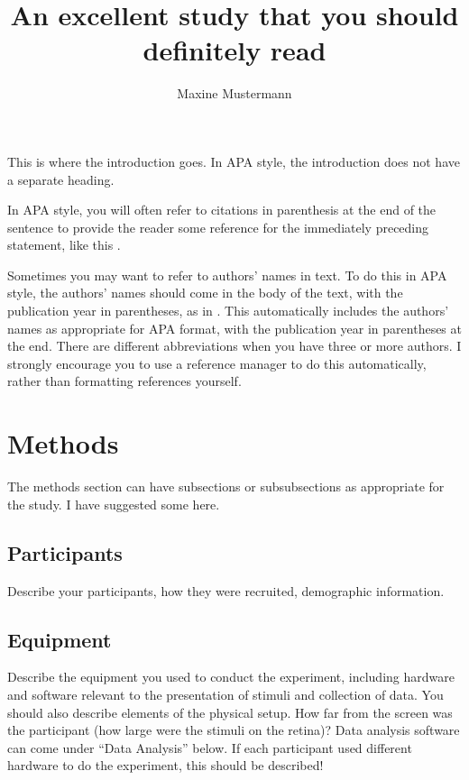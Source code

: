 \documentclass[
    a4paper,
    doc, %
    natbib
]{apa6}
\title{An excellent study that you should definitely read}
\author{Maxine Mustermann}
\affiliation{Centre for Cognitive Science, Technical University of Darmstadt}
\begin{document}
\maketitle

This is where the introduction goes. In APA style, the introduction does not have a separate heading.

In APA style, you will often refer to citations in parenthesis at the end of the sentence to provide the reader some reference for the immediately preceding statement, like this \citep{ringachSpatialTemporalProperties1996}.

Sometimes you may want to refer to authors' names in text.
To do this in APA style, the authors' names should come in the body of the text, with the publication year in parentheses, as in \citet{ringachSpatialTemporalProperties1996}.
This automatically includes the authors' names as appropriate for APA format, with the publication year in parentheses at the end.
There are different abbreviations when you have three or more authors. 
I strongly encourage you to use a reference manager to do this automatically, rather than formatting references yourself.

\section{Methods}

The methods section can have subsections or subsubsections as appropriate for the study. I have suggested some here.

\subsection{Participants}
Describe your participants, how they were recruited, demographic information.

\subsection{Equipment}

Describe the equipment you used to conduct the experiment, including hardware and software relevant to the presentation of stimuli and collection of data.
You should also describe elements of the physical setup. 
How far from the screen was the participant (how large were the stimuli on the retina)?
Data analysis software can come under ``Data Analysis'' below.
If each participant used different hardware to do the experiment, this should be described! 
\end{document}
